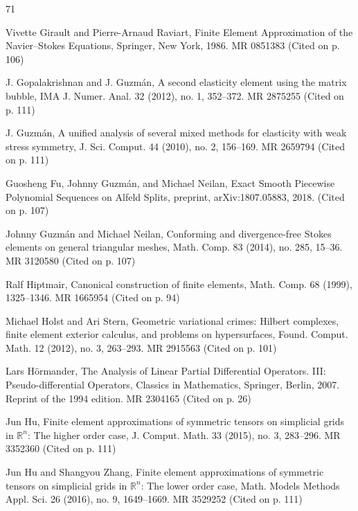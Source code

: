 \begin{MBSourceBibliography}{71}
\item\label{bib:source-45}Vivette Girault and Pierre-Arnaud Raviart, Finite Element Approximation of the Navier–Stokes Equations, Springer, New York, 1986. MR 0851383 (Cited on p. 106)

\item\label{bib:source-46}J. Gopalakrishnan and J. Guzmán, A second elasticity element using the matrix bubble, IMA J. Numer. Anal. 32 (2012), no. 1, 352–372. MR 2875255 (Cited on p. 111)

\item\label{bib:source-47}J. Guzmán, A unified analysis of several mixed methods for elasticity with weak stress symmetry, J. Sci. Comput. 44 (2010), no. 2, 156–169. MR 2659794 (Cited on p. 111)

\item\label{bib:source-48}Guosheng Fu, Johnny Guzmán, and Michael Neilan, Exact Smooth Piecewise Polynomial Sequences on Alfeld Splits, preprint, arXiv:1807.05883, 2018. (Cited on p. 107)

\item\label{bib:source-49}Johnny Guzmán and Michael Neilan, Conforming and divergence-free Stokes elements on general triangular meshes, Math. Comp. 83 (2014), no. 285, 15–36. MR 3120580 (Cited on p. 107)

\item\label{bib:source-50}Ralf Hiptmair, Canonical construction of finite elements, Math. Comp. 68 (1999), 1325–1346. MR 1665954 (Cited on p. 94)

\item\label{bib:source-51}Michael Holst and Ari Stern, Geometric variational crimes: Hilbert complexes, finite element exterior calculus, and problems on hypersurfaces, Found. Comput. Math. 12 (2012), no. 3, 263–293. MR 2915563 (Cited on p. 101)

\item\label{bib:source-52}Lars Hörmander, \newline The Analysis of Linear Partial Differential Operators. III: Pseudo-differential Operators, Classics in Mathematics, Springer, Berlin, 2007. Reprint of the 1994 edition. MR 2304165 (Cited on p. 26)

\item\label{bib:source-53}Jun Hu, Finite element approximations of symmetric tensors on simplicial grids in $\mathbb R^n$: The higher order case, J. Comput. Math. 33 (2015), no. 3, 283–296. MR 3352360 (Cited on p. 111)

\item\label{bib:source-54}Jun Hu and Shangyou Zhang, Finite element approximations of symmetric tensors on simplicial grids in $\mathbb R^n$: The lower order case, Math. Models Methods Appl. Sci. 26 (2016), no. 9, 1649–1669. MR 3529252 (Cited on p. 111)


\end{MBSourceBibliography}
